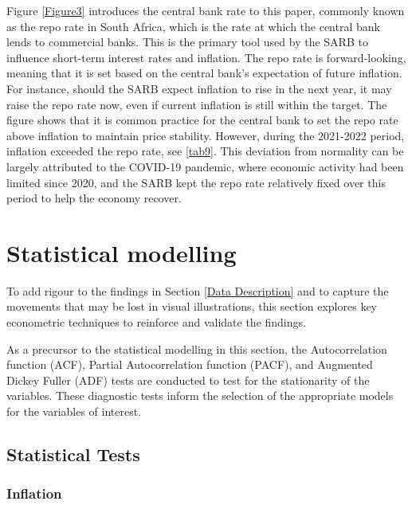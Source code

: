 \documentclass[11pt,preprint]{elsarticle}
\numberwithin{equation}{section}
\numberwithin{figure}{section}
\numberwithin{table}{section}
\begin{document}
Figure \ref{Figure3} introduces the central bank rate to this paper,
commonly known as the repo rate in South Africa, which is the rate at
which the central bank lends to commercial banks. This is the primary
tool used by the SARB to influence short-term interest rates and
inflation. The repo rate is forward-looking, meaning that it is set
based on the central bank's expectation of future inflation. For
instance, should the SARB expect inflation to rise in the next year, it
may raise the repo rate now, even if current inflation is still within
the target. The figure shows that it is common practice for the central
bank to set the repo rate above inflation to maintain price stability.
However, during the 2021-2022 period, inflation exceeded the repo rate,
see \ref{tab9}. This deviation from normality can be largely attributed
to the COVID-19 pandemic, where economic activity had been limited since
2020, and the SARB kept the repo rate relatively fixed over this period
to help the economy recover.

\section{\texorpdfstring{Statistical
modelling\label{Statistical modelling}}{Statistical modelling}}\label{statistical-modelling}

To add rigour to the findings in Section \ref{Data Description} and to
capture the movements that may be lost in visual illustrations, this
section explores key econometric techniques to reinforce and validate
the findings.

As a precursor to the statistical modelling in this section, the
Autocorrelation function (ACF), Partial Autocorrelation function (PACF),
and Augmented Dickey Fuller (ADF) tests are conducted to test for the
stationarity of the variables. These diagnostic tests inform the
selection of the appropriate models for the variables of interest.

\subsection{Statistical Tests}\label{statistical-tests}

\subsubsection{Inflation}\label{inflation}
\end{document}
